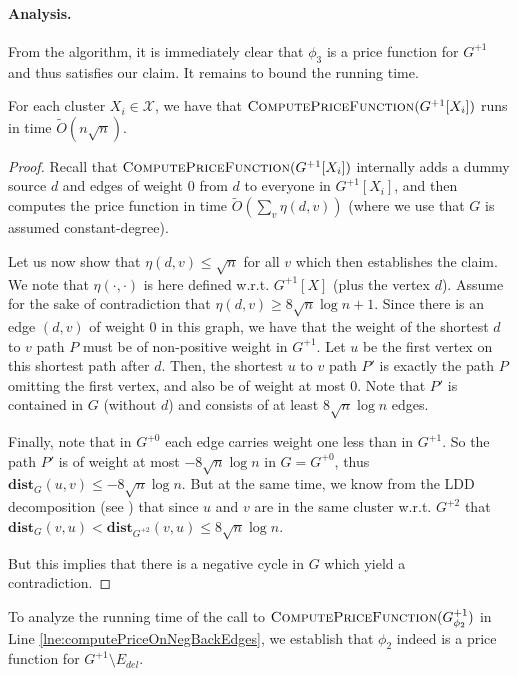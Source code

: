 \paragraph{Analysis.} From the algorithm, it is immediately clear that $\phi_3$ is a price function for $G^{+1}$ and thus satisfies our claim. It remains to bound the running time.

\begin{claim}
For each cluster $X_i \in \mathcal{X}$, we have that $\textsc{ComputePriceFunction}(G^{+1}[X_i])$ runs in time $\tilde{O}(n \sqrt{n})$. 
\end{claim}
\begin{proof}
Recall that  $\textsc{ComputePriceFunction}(G^{+1}[X_i])$ internally adds a dummy source $d$ and edges of weight $0$ from $d$ to everyone in $G^{+1}[X_i]$, and then computes the price function in time $\tilde{O}(\sum_v \eta(d,v))$ (where we use that $G$ is assumed constant-degree).

Let us now show that $\eta(d,v) \leq \sqrt{n}$ for all $v$ which then establishes the claim. We note that $\eta(\cdot, \cdot)$ is here defined w.r.t. $G^{+1}[X]$ (plus the vertex $d$). Assume for the sake of contradiction that $\eta(d,v) \geq 8\sqrt{n} \log n + 1$. Since there is an edge $(d,v)$ of weight $0$ in this graph, we have that the weight of the shortest $d$ to $v$ path $P$ must be of non-positive weight in $G^{+1}$. Let $u$ be the first vertex on this shortest path after $d$. Then, the shortest $u$ to $v$ path $P'$ is exactly the path $P$ omitting the first vertex, and also be of weight at most $0$. Note that $P'$ is contained in $G$ (without $d$) and consists of at least $8\sqrt{n} \log n$ edges. 

Finally, note that in $G^{+0}$ each edge carries weight one less than in $G^{+1}$. So the path $P'$ is of weight at most $-8\sqrt{n} \log n$ in $G = G^{+0}$, thus $\mathbf{dist}_G(u,v) \leq -8\sqrt{n} \log n$. But at the same time, we know from the LDD decomposition (see ) that since $u$ and $v$ are in the same cluster w.r.t. $G^{+2}$ that $\mathbf{dist}_{G}(v,u) < \mathbf{dist}_{G^{+2}}(v,u) \leq 8 \sqrt{n} \log n$. 

But this implies that there is a negative cycle in $G$ which yield a contradiction.
\end{proof}

To analyze the running time of the call to $ \textsc{ComputePriceFunction}(G^{+1}_{\phi_2})$ in Line \ref{lne:computePriceOnNegBackEdges}, we establish that $\phi_2$ indeed is a price function for $G^{+1} \setminus E_{del}$. 

